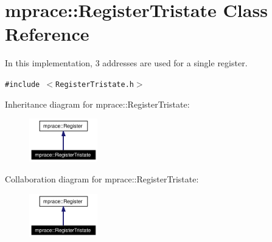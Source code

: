 \hypertarget{classmprace_1_1RegisterTristate}{
\section{mprace::Register\-Tristate Class Reference}
\label{classmprace_1_1RegisterTristate}
}
In this implementation, 3 addresses are used for a single register.  


{\tt \#include $<$Register\-Tristate.h$>$}

Inheritance diagram for mprace::Register\-Tristate:\begin{figure}[H]
\begin{center}
\leavevmode
\includegraphics[width=84pt]{classmprace_1_1RegisterTristate__inherit__graph}
\end{center}
\end{figure}
Collaboration diagram for mprace::Register\-Tristate:\begin{figure}[H]
\begin{center}
\leavevmode
\includegraphics[width=84pt]{classmprace_1_1RegisterTristate__coll__graph}
\end{center}
\end{figure}
